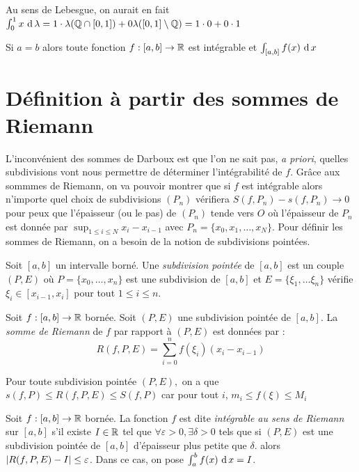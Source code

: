 \begin{remarque}
    Au sens de Lebesgue, on aurait en fait $\int_0^1x\,\operatorname{d} \lambda = 1\cdot\lambda(\mathbb{Q}\cap[0,1]) + 0\lambda([0,1]\setminus \mathbb{Q}) = 1\cdot 0 + 0\cdot 1$
\end{remarque}
\begin{remarque}
    Si $ a = b$ alors toute fonction $f : [a,b] \to \mathbb{R} $ est intégrable et $\int_{[a,b]}f(x)\,\operatorname{d} x$
\end{remarque}
\section{Définition à partir des sommes de Riemann}
L'inconvénient des sommes de Darboux est que l'on ne sait pas, \textit{a priori}, quelles subdivisions vont nous permettre de déterminer l'intégrabilité de $f$. Grâce aux sommmes de Riemann, on va pouvoir montrer que si $f$ est intégrable alors n'importe quel choix de subdivisions $(P_n)$ vérifiera $S(f,P_n)-s(f,P_n)\to 0$ pour peux que l'épaisseur (ou le pas) de $(P_n)$ tende vers $O$ où l'épaisseur de $P_n$ est donnée par $\sup_{1\le i\le N} x_i-x_{i-1}$ avec $P_n = \{x_0,x_1,\ldots , x_N\}$. Pour définir les sommes de Riemann, on a besoin de la notion de subdivisions pointées.
\begin{definition}
    Soit $[a,b]$ un intervalle borné. Une \emph{subdivision pointée} de $[a,b]$ est un couple $(P,E)$ où $P = \{x_0,\ldots, x_n\}$ est une subdivision de $[a,b]$ et $E =\{\xi_1,\ldots \xi_n\}$ vérifie $\xi_i\in [x_{i-1}, x_i]$ pour tout $1\le i\le n$.
\end{definition}
\begin{definition}
    Soit $f : [a,b] \to \mathbb{R}$ bornée.
    Soit $(P,E)$ une subdivision pointée de $[a,b]$.
    La \emph{somme de Riemann} de $f$ par rapport à $(P,E)$ est données par :
    $$ R(f,P,E) = \sum_{i = 0}^nf(\xi_i)(x_i - x_{i-1})$$
\end{definition}
\begin{remarque}
    Pour toute subdivision pointée $(P,E),$ on a que $s(f,P)\le R(f,P,E)\le S(f,P)$ car pour tout $i$, $m_i\le f(\xi)\le M_i$
\end{remarque}
\begin{definition}
    Soit $f: [a,b]\to \mathbb{R}$ bornée. La fonction $f$ est dite \emph{intégrable au sens de Riemann} sur $[a,b]$ s'il existe $I\in \mathbb{R}$ tel que $\forall \varepsilon>0,\exists\delta>0$ tels que si $(P,E)$ est une subdivision pointée de $[a,b]$ d'épaisseur plus petite que $\delta$. alors $\left| R(f,P,E)-I \right|\le \varepsilon$. Dans ce cas, on pose $\int_{a}^bf(x)\,\operatorname{d} x = I$.
\end{definition}
